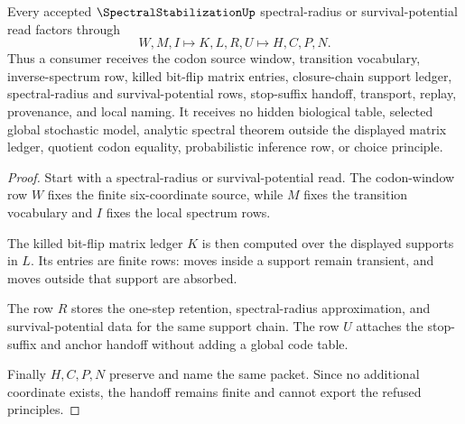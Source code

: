 \begin{theorem}
\label{thm:spectral-stabilization-window-handoff}
Every accepted $\SpectralStabilizationUp$ spectral-radius or survival-potential read factors through
$$
W,M,I \longmapsto K,L,R,U \longmapsto H,C,P,N .
$$
Thus a consumer receives the codon source window, transition vocabulary, inverse-spectrum row, killed bit-flip matrix entries, closure-chain support ledger, spectral-radius and survival-potential rows, stop-suffix handoff, transport, replay, provenance, and local naming. It receives no hidden biological table, selected global stochastic model, analytic spectral theorem outside the displayed matrix ledger, quotient codon equality, probabilistic inference row, or choice principle.
\end{theorem}
\begin{proof}
Start with a spectral-radius or survival-potential read. The codon-window row $W$ fixes the finite six-coordinate source, while $M$ fixes the transition vocabulary and $I$ fixes the local spectrum rows.

The killed bit-flip matrix ledger $K$ is then computed over the displayed supports in $L$. Its entries are finite rows: moves inside a support remain transient, and moves outside that support are absorbed.

The row $R$ stores the one-step retention, spectral-radius approximation, and survival-potential data for the same support chain. The row $U$ attaches the stop-suffix and anchor handoff without adding a global code table.

Finally $H,C,P,N$ preserve and name the same packet. Since no additional coordinate exists, the handoff remains finite and cannot export the refused principles.
\end{proof}



